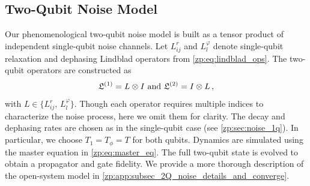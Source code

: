 \begin{table}[htbp]
\centering
\setlength{\tabcolsep}{3.5pt}
\renewcommand{\arraystretch}{1.2} %
\caption[Optimized CZ pulse parameters.]{
The parameters of the two CZ pulses corresponding to the red star and pentagon in \cref{zp:fig:2q_fidelity}.
$A_i/2\pi$
is limited to be less than $250$ MHz.
The effective Rabi rate is given by $\Omega_{1}=A_1(e^2-1)n_{\rm op}$.
}\label{zp:tab:parameter_cz}
\end{table}

\subsection{Two-Qubit Noise Model}\label{zp:sec:noise_2q}

Our phenomenological two-qubit noise model is built as a tensor product of independent single-qubit noise channels.
Let $L^r_{ij}$ and $L^\varphi_l$ denote single-qubit relaxation and dephasing Lindblad operators from \cref{zp:eq:lindblad_ops}.
The two-qubit operators are constructed as
\begin{equation}
\mathfrak{L}^{(1)} = L \otimes I\,\, {\rm and} \,\, \mathfrak{L}^{(2)} = I \otimes L\,,
\end{equation}
with $L \in \{L^r_{ij},\, L^\varphi_l\}$.
Though each operator requires multiple indices to characterize the noise process, here we omit them for clarity.
The decay and dephasing rates are chosen as in the single-qubit case (see \cref{zp:sec:noise_1q}).
In particular, we choose $T_1= T_\phi=T$ for both qubits.
Dynamics are simulated using the master equation in \cref{zp:eq:master_eq}.
The full two-qubit state is evolved to obtain a propagator and gate fidelity.
We provide a more thorough description of the open-system model in \cref{zp:app:subsec_2Q_noise_details_and_converge}.

